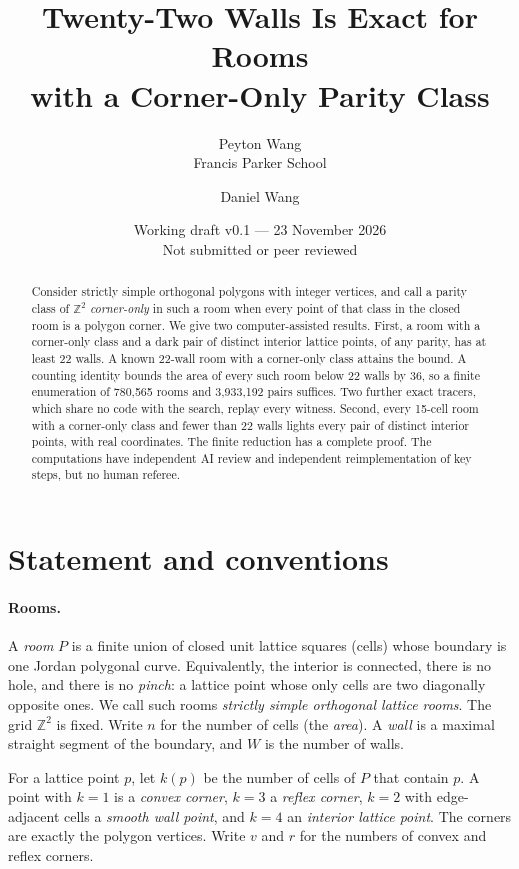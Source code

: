 \documentclass[11pt]{article}
\title{Twenty-Two Walls Is Exact for Rooms\\with a Corner-Only Parity Class}
\author{Peyton Wang\\\small Francis Parker School \and Daniel Wang}
\date{Working draft v0.1 --- 23 November 2026\\\small Not submitted or peer reviewed}
\theoremstyle{definition}
\theoremstyle{remark}
\newcommand{\Z}{\mathbb Z}
\begin{document}
\maketitle
\begin{abstract}
Consider strictly simple orthogonal polygons with integer vertices, and
call a parity class of $\Z^2$ \emph{corner-only} in such a room when every
point of that class in the closed room is a polygon corner. We give two
computer-assisted results. First, a room with a corner-only class and a dark
pair of distinct interior lattice points, of any parity, has at least 22
walls. A known 22-wall room with a corner-only class attains the bound. A
counting identity bounds the area of every such room below 22 walls by 36,
so a finite enumeration of 780{,}565 rooms and 3{,}933{,}192 pairs suffices.
Two further exact tracers, which share no code with the search, replay
every witness.
Second, every 15-cell room with a corner-only class and fewer than 22 walls
lights every pair of distinct interior points, with real coordinates. The
finite reduction has a complete proof. The computations have independent
AI review and independent reimplementation of key steps, but no human
referee.
\end{abstract}

\section{Statement and conventions}
\paragraph{Rooms.}
A \emph{room} $P$ is a finite union of closed unit lattice squares (cells)
whose boundary is one Jordan polygonal curve. Equivalently, the interior is
connected, there is no hole, and there is no \emph{pinch}: a lattice point
whose only cells are two diagonally opposite ones. We call such rooms
\emph{strictly simple orthogonal lattice rooms}. The grid $\Z^2$ is fixed.
Write $n$ for the number of cells (the \emph{area}). A \emph{wall} is a
maximal straight segment of the boundary, and $W$ is the number of walls.

For a lattice point $p$, let $k(p)$ be the number of cells of $P$ that
contain $p$. A point with $k=1$ is a \emph{convex corner}, $k=3$ a
\emph{reflex corner}, $k=2$ with edge-adjacent cells a \emph{smooth wall
point}, and $k=4$ an \emph{interior lattice point}. The corners are exactly
the polygon vertices. Write $v$ and $r$ for the numbers of convex and
reflex corners.
\end{document}

